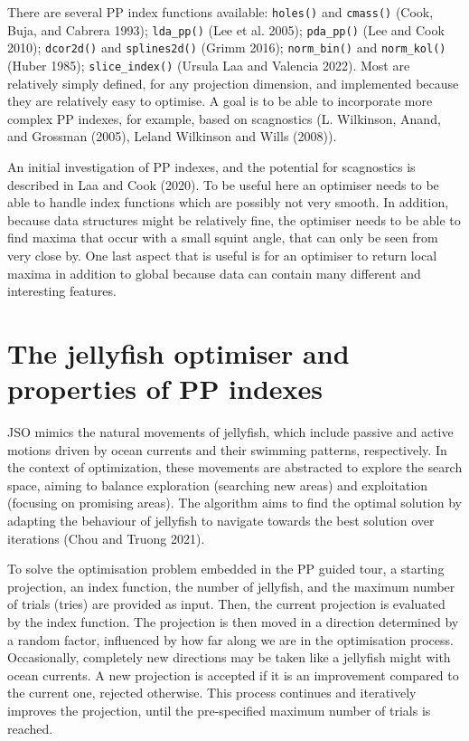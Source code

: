 \documentclass[
  12pt,
]{interact}
\theoremstyle{plain}
\begin{document}
There are several PP index functions available: \texttt{holes()} and
\texttt{cmass()} (Cook, Buja, and Cabrera 1993); \texttt{lda\_pp()} (Lee
et al. 2005); \texttt{pda\_pp()} (Lee and Cook 2010); \texttt{dcor2d()}
and \texttt{splines2d()} (Grimm 2016); \texttt{norm\_bin()} and
\texttt{norm\_kol()} (Huber 1985); \texttt{slice\_index()} (Ursula Laa
and Valencia 2022). Most are relatively simply defined, for any
projection dimension, and implemented because they are relatively easy
to optimise. A goal is to be able to incorporate more complex PP
indexes, for example, based on scagnostics (L. Wilkinson, Anand, and
Grossman (2005), Leland Wilkinson and Wills (2008)).

An initial investigation of PP indexes, and the potential for
scagnostics is described in Laa and Cook (2020). To be useful here an
optimiser needs to be able to handle index functions which are possibly
not very smooth. In addition, because data structures might be
relatively fine, the optimiser needs to be able to find maxima that
occur with a small squint angle, that can only be seen from very close
by. One last aspect that is useful is for an optimiser to return local
maxima in addition to global because data can contain many different and
interesting features.

\section{The jellyfish optimiser and properties of PP
indexes}\label{sec-theory}

JSO mimics the natural movements of jellyfish, which include passive and
active motions driven by ocean currents and their swimming patterns,
respectively. In the context of optimization, these movements are
abstracted to explore the search space, aiming to balance exploration
(searching new areas) and exploitation (focusing on promising areas).
The algorithm aims to find the optimal solution by adapting the
behaviour of jellyfish to navigate towards the best solution over
iterations (Chou and Truong 2021).

To solve the optimisation problem embedded in the PP guided tour, a
starting projection, an index function, the number of jellyfish, and the
maximum number of trials (tries) are provided as input. Then, the
current projection is evaluated by the index function. The projection is
then moved in a direction determined by a random factor, influenced by
how far along we are in the optimisation process. Occasionally,
completely new directions may be taken like a jellyfish might with ocean
currents. A new projection is accepted if it is an improvement compared
to the current one, rejected otherwise. This process continues and
iteratively improves the projection, until the pre-specified maximum
number of trials is reached.
\end{document}
